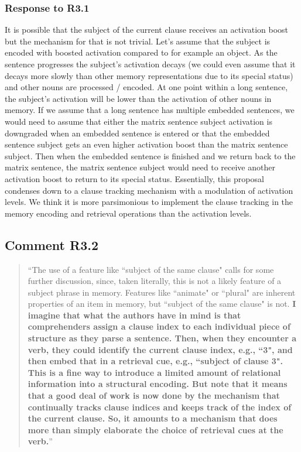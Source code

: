 \documentclass[12pt]{article}
\begin{document}
\subsubsection*{Response to R3.1}
It is possible that the subject of the current clause receives an activation boost but the mechanism for that is not trivial. Let's assume that the subject is encoded with boosted activation compared to for example an object. As the sentence progresses the subject's activation decays (we could even assume that it decays more slowly than other memory representations due to its special status) and other nouns are processed / encoded. At one point within a long sentence, the subject's activation will be lower than the activation of other nouns in memory. If we assume that a long sentence has multiple embedded sentences, we would need to assume that either the matrix sentence subject activation is downgraded when an embedded sentence is entered or that the embedded sentence subject gets an even higher activation boost than the matrix sentence subject. Then when the embedded sentence is finished and we return back to the matrix sentence, the matrix sentence subject would need to receive another activation boost to return to its special status. Essentially, this proposal condenses down to a clause tracking mechanism with a modulation of activation levels. We think it is more parsimonious to implement the clause tracking in the memory encoding and retrieval operations than the activation levels. 

\subsection*{Comment R3.2}
\begin{quote}
``The use of a feature like ``subject of the same clause" calls for some further discussion, since, taken literally, this is not a likely feature of a subject phrase in memory. Features like ``animate" or ``plural" are inherent properties of an item in memory, but ``subject of the same clause" is not. \textbf{I imagine that what the authors have in mind is that comprehenders assign a clause index to each individual piece of structure as they parse a sentence. Then, when they encounter a verb, they could identify the current clause index, e.g., ``3", and then embed that in a retrieval cue, e.g., ``subject of clause 3". This is a fine way to introduce a limited amount of relational information into a structural encoding. But note that it means that a good deal of work is now done by the mechanism that continually tracks clause indices and keeps track of the index of the current clause. So, it amounts to a mechanism that does more than simply elaborate the choice of retrieval cues at the verb.}''
\end{quote}
\end{document}
